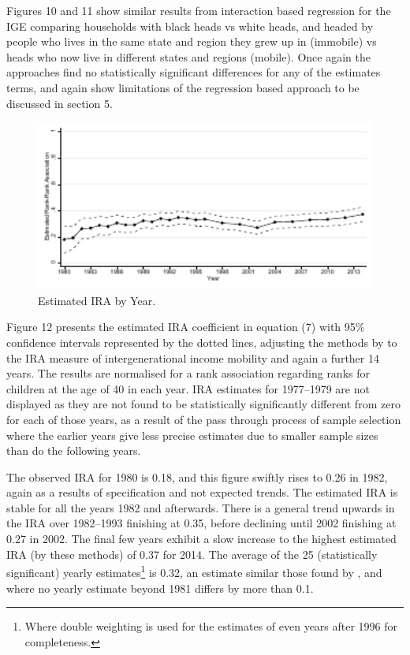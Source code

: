 \documentclass[notitlepage,12pt]{article}
\begin{document}
Figures 10 and 11 show similar results from interaction based regression for the IGE comparing households with black heads vs white heads, and headed by people who lives in the same state and region they grew up in (immobile) vs heads who now live in different states and regions (mobile).  Once again the approaches find no statistically significant differences for any of the estimates terms, and again show limitations of the regression based approach to be discussed in section 5.
\begin{figure}[H]
  \centering
  \caption{Estimated IRA by Year.}
  \includegraphics[width=6in]{Graph13.pdf}
\end{figure}

Figure 12 presents the estimated IRA coefficient in equation (7) with 95\% confidence intervals represented by the dotted lines, adjusting the methods by \cite{lee2009trends} to the IRA measure of intergenerational income mobility and again a further 14 years.  The results are normalised for a rank association regarding ranks for children at the age of 40 in each year.   IRA estimates for 1977--1979 are not displayed as they are not found to be statistically significantly different from zero for each of those years, as a result of the pass through process of sample selection where the earlier years give less precise estimates due to smaller sample sizes than do the following years.  

The observed IRA for 1980 is 0.18, and this figure swiftly rises to 0.26 in 1982, again as a results of specification and not expected trends.  The estimated IRA is stable for all the years 1982 and afterwards.  There is a general trend upwards in the IRA over 1982--1993 finishing at 0.35, before declining until 2002 finishing at 0.27 in 2002.  The final few years exhibit a slow increase to the highest estimated IRA (by these methods) of 0.37 for 2014.  The average of the 25 (statistically significant) yearly estimates\footnote{Where double weighting is used for the estimates of even years after 1996 for completeness.} is 0.32, an estimate similar those found by \cite{chetty2014united}, and where no yearly estimate beyond 1981 differs by more than 0.1.
\end{document}
